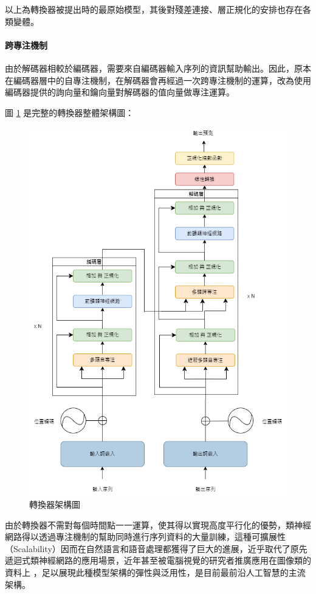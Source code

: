 以上為轉換器被提出時的最原始模型，其後對殘差連接、層正規化的安排也存在各類變體。

\paragraph{跨專注機制}

由於解碼器相較於編碼器，需要來自編碼器輸入序列的資訊幫助輸出。因此，原本在編碼器層中的自專注機制，在解碼器會再經過一次跨專注機制的運算，改為使用編碼器提供的詢向量和鑰向量對解碼器的值向量做專注運算。

圖 \ref{fig:tfm_arch} 是完整的轉換器整體架構圖：
\begin{figure}
    \centering
    \includegraphics[width=0.9\linewidth]{figures/tfm_arch.drawio.png}
    \caption{轉換器架構圖}
    \label{fig:tfm_arch}
\end{figure}

由於轉換器不需對每個時間點一一運算，使其得以實現高度平行化的優勢，類神經網路得以透過專注機制的幫助同時進行序列資料的大量訓練，這種可擴展性（Scalability）因而在自然語言和語音處理都獲得了巨大的進展，近乎取代了原先遞迴式類神經網路的應用場景，近年甚至被電腦視覺的研究者推廣應用在圖像類的資料上 \cite{dosovitskiy2021image}，足以展現此種模型架構的彈性與泛用性，是目前最前沿人工智慧的主流架構。

